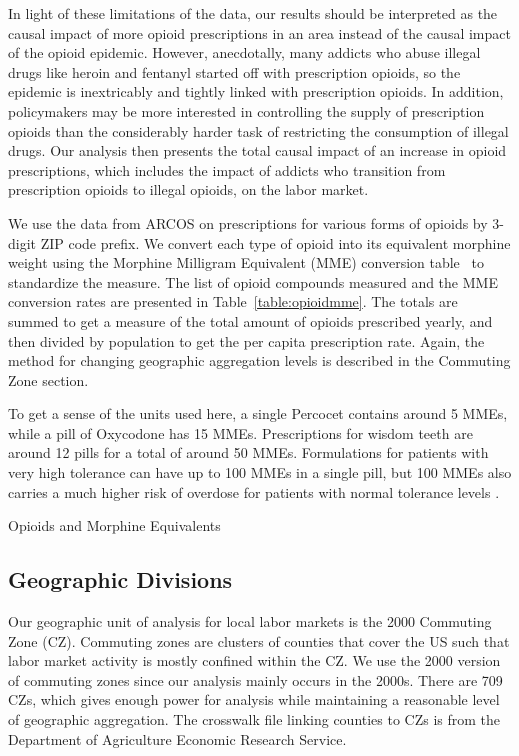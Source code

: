 \documentclass[12pt]{article}
\begin{document}
In light of these limitations of the data, our results should be interpreted as the causal impact of more opioid prescriptions in an area instead of the causal impact of the opioid epidemic.  However, anecdotally, many addicts who abuse illegal drugs like heroin and fentanyl started off with prescription opioids, so the epidemic is inextricably and tightly linked with prescription opioids.
In addition, policymakers may be more interested in controlling the supply of prescription opioids than the considerably harder task of restricting the consumption of illegal drugs.  Our analysis then presents the total causal impact of an increase in opioid prescriptions, which includes the impact of addicts who transition from prescription opioids to illegal opioids, on the labor market.

We use the data from ARCOS on prescriptions for various forms of opioids by 3-digit ZIP code prefix.  We convert each type of opioid into its equivalent morphine weight using the Morphine Milligram Equivalent (MME) conversion table~ to standardize the measure.  The list of opioid compounds measured and the MME conversion rates are presented in Table~\ref{table:opioidmme}.  The totals are summed to get a measure of the total amount of opioids prescribed yearly, and then divided by population to get the per capita prescription rate.  Again, the method for changing geographic aggregation levels is described in the Commuting Zone section.

To get a sense of the units used here, a single Percocet contains around 5 MMEs, while a pill of Oxycodone has 15 MMEs.  Prescriptions for wisdom teeth are around 12 pills for a total of around 50 MMEs.  Formulations for patients with very high tolerance can have up to 100 MMEs in a single pill, but 100 MMEs also carries a much higher risk of overdose for patients with normal tolerance levels \parencite{nihoverdose}.

\begin{table}
    \footnotesize
    \centering
    \caption{Opioids and Morphine Equivalents}
    
    \label{table:opioidmme}
\end{table}

\subsection{Geographic Divisions}
Our geographic unit of analysis for local labor markets is the 2000 Commuting Zone (CZ).  Commuting zones are clusters of counties that cover the US such that labor market activity is mostly confined within the CZ\@.  We use the 2000 version of commuting zones since our analysis mainly occurs in the 2000s.  There are 709 CZs, which gives enough power for analysis while maintaining a reasonable level of geographic aggregation.  The crosswalk file linking counties to CZs is from the Department of Agriculture Economic Research Service.~
\end{document}
